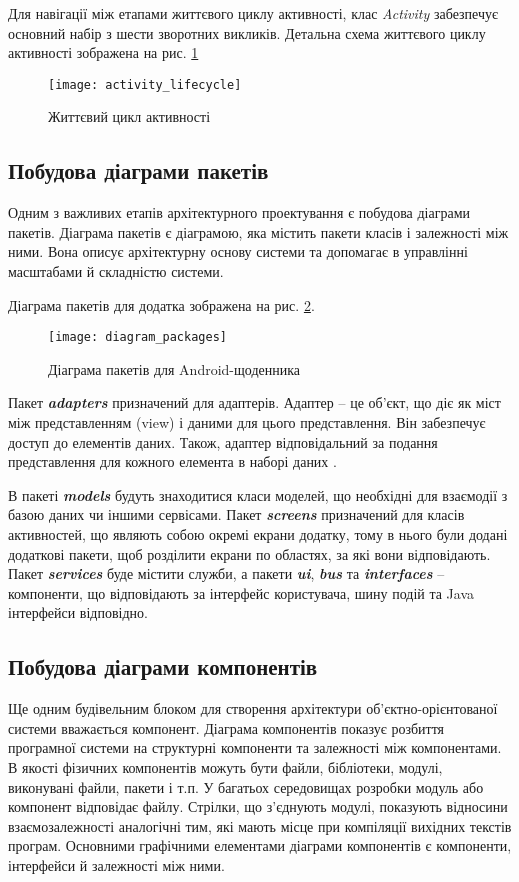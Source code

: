 \documentclass[../main.tex]{subfiles}
\begin{document}
Для навігації між етапами життєвого циклу активності, клас \textit{Activity} забезпечує основний набір з шести зворотних викликів. Детальна схема життєвого циклу активності зображена  на рис. \ref{diagram:activity_lifecycle}

\begin{figure}[H]
	\centering
	\texttt{[image: activity\_lifecycle]}
	\caption{Життєвий цикл активності}
	\label{diagram:activity_lifecycle}
\end{figure}

\subsection{Побудова діаграми пакетів}
Одним з важливих етапів архітектурного проектування є побудова діаграми пакетів. Діаграма пакетів є діаграмою, яка містить пакети класів і залежності між ними. Вона описує архітектурну основу системи та допомагає в управлінні масштабами й складністю системи. 

Діаграма пакетів для додатка зображена на рис. \ref{diagram:packages}.
\vspace{\baselineskip}

\begin{figure}[H]
	\centering
	\texttt{[image: diagram\_packages]}
	\caption{Діаграма пакетів для Android-щоденника}
	\label{diagram:packages}
\end{figure}

Пакет \textit{\textbf{adapters}} призначений для адаптерів. Адаптер -- це об'єкт, що діє як міст між представленням (view) і даними для цього представлення. Він забезпечує доступ до елементів даних. Також, адаптер відповідальний за подання представлення для кожного елемента в наборі даних \cite{adapter}. 

В пакеті \textit{\textbf{models}} будуть знаходитися класи моделей, що необхідні для взаємодії з базою даних чи іншими сервісами. Пакет \textit{\textbf{screens}} призначений для класів активностей, що являють собою окремі екрани додатку, тому в нього були додані додаткові пакети, щоб розділити екрани по областях, за які вони відповідають. Пакет \textit{\textbf{services}} буде містити служби, а пакети \textit{\textbf{ui}}, \textit{\textbf{bus}} та \textit{\textbf{interfaces}} -- компоненти, що відповідають за інтерфейс користувача, шину подій та Java інтерфейси відповідно. 

\subsection{Побудова діаграми компонентів}
Ще одним будівельним блоком для створення архітектури об'єктно-орієнтованої системи вважається компонент. Діаграма компонентів показує розбиття програмної системи на структурні компоненти та залежності між компонентами. В якості фізичних компонентів можуть бути файли, бібліотеки, модулі, виконувані файли, пакети і т.п. У багатьох середовищах розробки модуль або компонент відповідає файлу. Стрілки, що з'єднують модулі, показують відносини взаємозалежності аналогічні тим, які мають місце при компіляції вихідних текстів програм. Основними графічними елементами діаграми компонентів є компоненти, інтерфейси й залежності між ними. 
\end{document}
